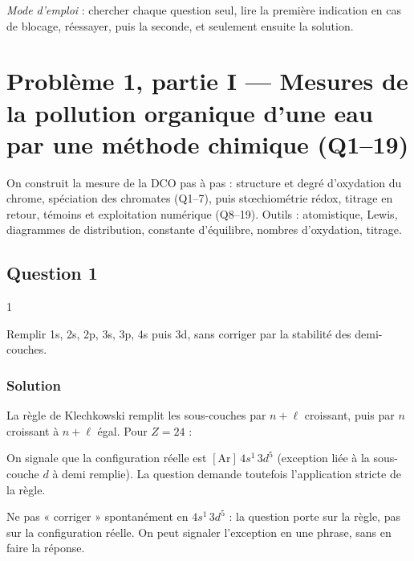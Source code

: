 \documentclass[11pt,a4paper]{article}
\newcommand{\equationajustee}[1]{%
  \sbox{\boiteequation}{$\displaystyle #1$}%
  \ifdim\wd\boiteequation>\linewidth
    \[\resizebox{\linewidth}{!}{\usebox{\boiteequation}}\]%
  \else
    \[#1\]%
  \fi}
\begin{document}
\emph{Mode d'emploi} : chercher chaque question seul, lire la première indication en cas de blocage, réessayer, puis la seconde, et seulement ensuite la solution.

\hypertarget{probluxe8me-1-partie-i-mesures-de-la-pollution-organique-dune-eau-par-une-muxe9thode-chimique-q119}{%
\section{Problème 1, partie I --- Mesures de la pollution organique d'une eau par une méthode chimique (Q1--19)}\label{probluxe8me-1-partie-i-mesures-de-la-pollution-organique-dune-eau-par-une-muxe9thode-chimique-q119}}

On construit la mesure de la DCO pas à pas : structure et degré d'oxydation du chrome, spéciation des chromates (Q1--7), puis stœchiométrie rédox, titrage en retour, témoins et exploitation numérique (Q8--19). Outils : atomistique, Lewis, diagrammes de distribution, constante d'équilibre, nombres d'oxydation, titrage.

\hypertarget{question-1}{%
\subsection{Question 1}\label{question-1}}

\begin{indication}{1}

Remplir 1s, 2s, 2p, 3s, 3p, 4s puis 3d, sans corriger par la stabilité des demi-couches.

\end{indication}

\hypertarget{solution}{%
\subsubsection{Solution}\label{solution}}

La règle de Klechkowski remplit les sous-couches par \(n+\ell\) croissant, puis par \(n\) croissant à \(n+\ell\) égal. Pour \(Z=24\) :

\equationajustee{\boxed{\mathrm{Cr} : 1s^2\,2s^2\,2p^6\,3s^2\,3p^6\,4s^2\,3d^4}}

On signale que la configuration réelle est \([\mathrm{Ar}]\,4s^1\,3d^5\) (exception liée à la sous-couche \(d\) à demi remplie). La question demande toutefois l'application stricte de la règle.

\begin{piege}

Ne pas « corriger » spontanément en \(4s^1\,3d^5\) : la question porte sur la règle, pas sur la configuration réelle. On peut signaler l'exception en une phrase, sans en faire la réponse.

\end{piege}
\end{document}
